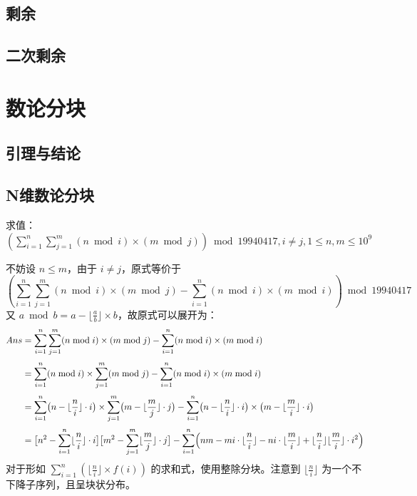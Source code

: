 \documentclass[12pt,a4paper]{article}
\begin{document}
\subsection{剩余}
\subsection{二次剩余}

\newpage
\section{数论分块}
\subsection{引理与结论}
\subsection{N维数论分块}
\begin{mdframed}[leftline=true, linewidth=2pt, linecolor=gray]
	求值：$\displaystyle(\sum_{i=1}^{n} \sum_{j=1}^{m} (n \bmod i) \times (m \bmod j))\bmod{19940417},i \neq j,1 \leq n,m \leq 10^9$
\end{mdframed}
不妨设 $n\le m$，由于 $i\ne j$，原式等价于 \begin{equation*}
	\displaystyle(\sum_{i=1}^{n} \sum_{j=1}^{m} (n \bmod i) \times (m \bmod j)-\sum_{i=1}^{n}(n \bmod i) \times (m \bmod i))\bmod{19940417}
\end{equation*}
又 $\displaystyle a\bmod b=a-\lfloor\frac{a}{b}\rfloor\times b$，故原式可以展开为：
\begin{align*}
	\displaystyle Ans &= 
	\sum_{i=1}^{n} \sum_{j=1}^{m} (n \bmod i) \times (m \bmod j)
	- \sum_{i=1}^{n} (n \bmod i) \times (m \bmod i) \\[1mm]
	&= \sum_{i=1}^{n} (n \bmod i) \times \sum_{j=1}^{m} (m \bmod j)
	- \sum_{i=1}^{n} (n \bmod i) \times (m \bmod i) \\[1mm]
	&= \sum_{i=1}^{n} \bigl(n - \lfloor \frac{n}{i} \rfloor \cdot i \bigr)
	\times \sum_{j=1}^{m} \bigl(m - \lfloor \frac{m}{j} \rfloor \cdot j \bigr)
	- \sum_{i=1}^{n} \bigl(n - \lfloor \frac{n}{i} \rfloor \cdot i \bigr)
	\times \bigl(m - \lfloor \frac{m}{i} \rfloor \cdot i \bigr) \\[1mm]
	&= \bigl[n^2 - \sum_{i=1}^{n} \lfloor \frac{n}{i} \rfloor \cdot i \bigr]
	\bigl[m^2 - \sum_{j=1}^{m} \lfloor \frac{m}{j} \rfloor \cdot j \bigr] 
	- \sum_{i=1}^{n} \Bigl(nm - m i \cdot \lfloor \frac{n}{i} \rfloor - n i \cdot \lfloor \frac{m}{i} \rfloor + \lfloor \frac{n}{i} \rfloor \lfloor \frac{m}{i} \rfloor \cdot i^2 \Bigr)
\end{align*}
对于形如 $\displaystyle \sum_{i=1}^{n}(\lfloor\frac{n}{i}\rfloor\times f(i))$ 的求和式，使用整除分块。注意到 $\displaystyle\lfloor\frac{n}{i}\rfloor$ 为一个不下降子序列，且呈块状分布。\\
\end{document}

